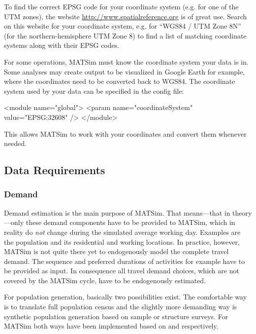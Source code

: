 To find the correct EPSG code for your coordinate system (e.g. for one of the UTM zones), the website \url{http://www.spatialreference.org} is of great use. Search on this website for your coordinate system, e.g. for ``WGS84 / UTM Zone 8N'' (for the northern-hemisphere UTM Zone 8) to find a list of matching coordinate systems along with their EPSG codes.

For some operations, MATSim must know the coordinate system your data is in. Some analyses may create output to be visualized in Google Earth for example, where the coordinates need to be converted back to WGS84. The coordinate system used by your data can be specified in the config file:

\begin{xml}
<module name="global"> 
  <param name="coordinateSystem" value="EPSG:32608" /> 
</module>
\end{xml}

This allows MATSim to work with your coordinates and convert them whenever needed. 

\subsection{Data Requirements}
\subsubsection{Demand}
Demand estimation is the main purpose of MATSim. That means---that in theory---only these demand components have to be provided to MATSim, which in reality do \emph{not} change during the simulated average working day. Examples are the population and its residential and working locations. In practice, however, MATSim is not quite there yet to endogenously model the complete travel demand. The sequence and preferred durations of activities for example have to be provided as input. In consequence all travel demand choices, which are not covered by the MATSim cycle, have to be endogenously estimated. 

For population generation, basically two possibilities exist. The comfortable way is to translate full population census and the slightly more demanding way is synthetic population generation \citep[e.g.,][]{} based on sample or structure surveys. For MATSim both ways have been implemented based on \citet[][]{BfS_VZ_2000} and \citet[][]{Mueller_unpub_STRC_2011} respectively.

